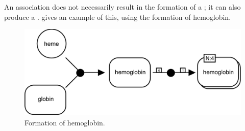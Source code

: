 An association does not necessarily result in the formation of a ; it can also produce a .   gives an example of this, using the formation of hemoglobin.

\begin{figure}[H]
  \centering
  \includegraphics[scale = 0.3]{examples/association-multimerisation}
  \caption{Formation of hemoglobin.}
  \label{fig:assoc-multi}
\end{figure}



